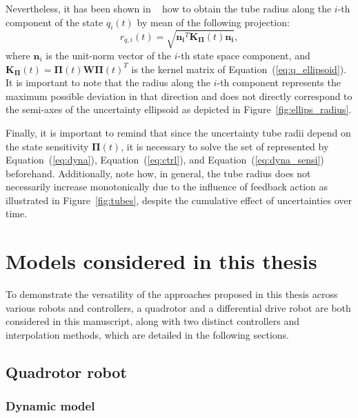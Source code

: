 Nevertheless, it has been shown in ~\cite{cTube} how to obtain the tube radius along the $i$-th component of the state $q_i(t)$ by mean of the following projection:
\begin{equation}\label{eq:radius}
  r_{q,i}(t) =  \sqrt{\boldsymbol{n_i}^{T} \boldsymbol{K_{\Pi}}(t) \boldsymbol{n_i}},
\end{equation}
where $\boldsymbol{n}_i$ is the unit-norm vector of the $i$-th state space component, and $\boldsymbol{K_{\Pi}}(t) = \boldsymbol{\Pi}(t)\boldsymbol{W}\boldsymbol{\Pi}(t)^T$ is the kernel matrix of Equation~(\ref{eq:q_ellipsoid}).
It is important to note that the radius along the $i$-th component represents the maximum possible deviation in that direction and does not directly correspond to the semi-axes of the uncertainty ellipsoid as depicted in Figure~\ref{fig:ellips_radius}.

Finally, it is important to remind that since the uncertainty tube radii depend on the state sensitivity $\boldsymbol{\Pi}(t)$, it is necessary to solve the set of  represented by Equation~(\ref{eq:dyna}), Equation~(\ref{eq:ctrl}), and Equation~(\ref{eq:dyna_sensi}) beforehand.
Additionally, note how, in general, the tube radius does not necessarily increase monotonically due to the influence of feedback action as illustrated in Figure~\ref{fig:tubes}, despite the cumulative effect of uncertainties over time. 

\section{Models considered in this thesis}

To demonstrate the versatility of the approaches proposed in this thesis across various robots and controllers, a quadrotor and a differential drive robot are both considered in this manuscript, along with two distinct controllers and interpolation methods, which are detailed in the following sections.

\subsection{Quadrotor robot} \label{sec:quad_model}

\subsubsection{Dynamic model}

